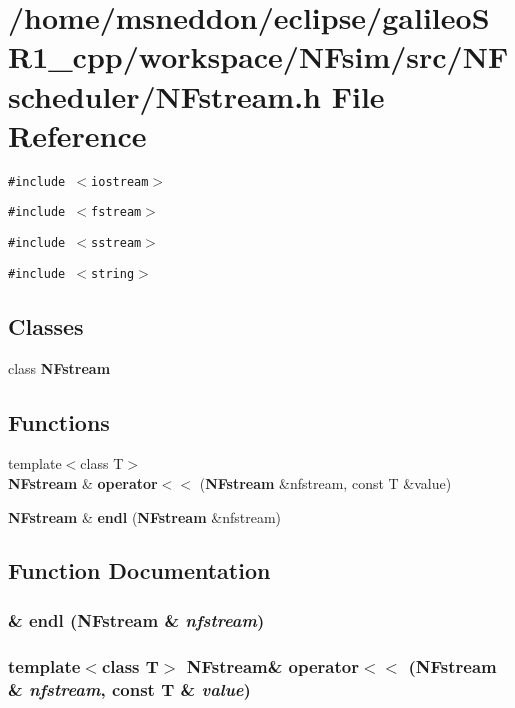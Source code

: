 \section{/home/msneddon/eclipse/galileoSR1\_\-cpp/workspace/NFsim/src/NFscheduler/NFstream.h File Reference}
\label{NFstream_8h}


{\tt \#include $<$iostream$>$}\par
{\tt \#include $<$fstream$>$}\par
{\tt \#include $<$sstream$>$}\par
{\tt \#include $<$string$>$}\par
\subsection*{Classes}
\begin{CompactItemize}
\item 
class {\bf NFstream}
\end{CompactItemize}
\subsection*{Functions}
\begin{CompactItemize}
\item 
{\footnotesize template$<$class T$>$ }\\{\bf NFstream} \& {\bf operator$<$$<$} ({\bf NFstream} \&nfstream, const T \&value)
\item 
{\bf NFstream} \& {\bf endl} ({\bf NFstream} \&nfstream)
\end{CompactItemize}


\subsection{Function Documentation}
\subsubsection{\& endl ({\bf NFstream} \& {\em nfstream})}\label{NFstream_8h_70d95b404a0185199948bf778584bdc3}


\subsubsection{\setlength{\rightskip}{0pt plus 5cm}template$<$class T$>$ {\bf NFstream}\& operator$<$$<$ ({\bf NFstream} \& {\em nfstream}, const T \& {\em value})\hspace{0.3cm}{\tt  [inline]}}\label{NFstream_8h_ef588953052314e1b69285568a59947f}


